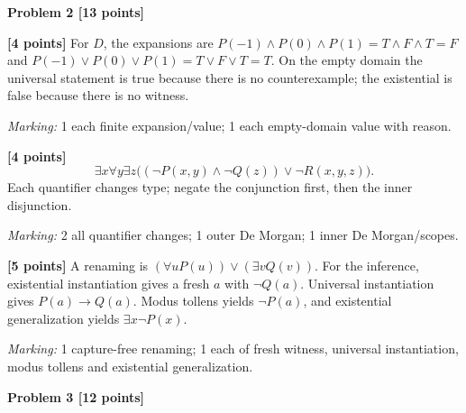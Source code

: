 \documentclass[12pt,letterpaper]{article}
\newcommand{\problemheading}[2][5\baselineskip]{\Needspace{#1}\par\noindent\hspace*{-0.625in}\textbf{#2}\par\nobreak\vspace{0.3em}}
\begin{document}
\problemheading[\dimexpr 3\baselineskip+4\baselineskip\relax]{Problem 2 [13 points]}
\begin{description}[font=\normalfont,leftmargin=1.2em,labelsep=0.4em]
\item[(a)] \textbf{[4 points]} For $D$, the expansions are $P(-1)\land P(0)\land P(1)=T\land F\land T=F$ and $P(-1)\lor P(0)\lor P(1)=T\lor F\lor T=T$. On the empty domain the universal statement is true because there is no counterexample; the existential is false because there is no witness.
\par\textit{Marking:} 1 each finite expansion/value; 1 each empty-domain value with reason.
\item[(b)] \textbf{[4 points]} \[\exists x\forall y\exists z\bigl((\neg P(x,y)\land\neg Q(z))\lor\neg R(x,y,z)\bigr).\] Each quantifier changes type; negate the conjunction first, then the inner disjunction.
\par\textit{Marking:} 2 all quantifier changes; 1 outer De Morgan; 1 inner De Morgan/scopes.
\item[(c)] \textbf{[5 points]} A renaming is $(\forall uP(u))\lor(\exists vQ(v))$. For the inference, existential instantiation gives a fresh $a$ with $\neg Q(a)$. Universal instantiation gives $P(a)\to Q(a)$. Modus tollens yields $\neg P(a)$, and existential generalization yields $\exists x\neg P(x)$.
\par\textit{Marking:} 1 capture-free renaming; 1 each of fresh witness, universal instantiation, modus tollens and existential generalization.
\end{description}
\vspace{0.65em}
\problemheading[\dimexpr 3\baselineskip+4\baselineskip\relax]{Problem 3 [12 points]}
\end{document}
